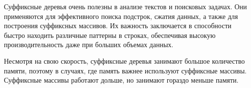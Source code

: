 \documentclass[12pt]{article}
\begin{document}
Суффиксные деревья очень полезны в анализе текстов и поисковых задачах.
Они применяются для эффективного поиска подстрок,
сжатия данных, а также для построения суффиксных массивов.
Их важность заключается в способности
быстро находить различные паттерны в строках, обеспечивая высокую
производительность даже при больших объемах данных.

Несмотря на свою скорость, суффиксные деревья занимают большое количество
памяти, поэтому в случаях, где память важнее используют суффиксные массивы.
Суффиксные массивы работают дольше, но занимают гораздо меньше памяти.
\end{document}
